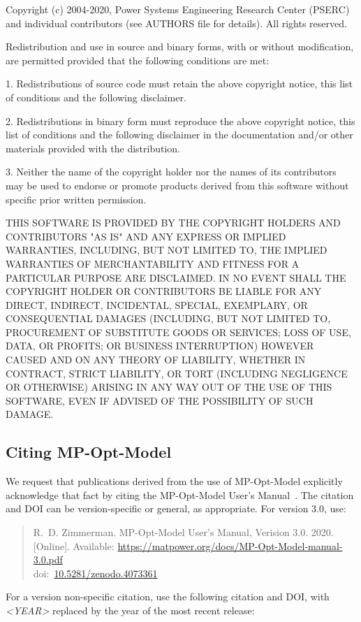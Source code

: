 \documentclass[12pt]{article}
\newcommand{\mpom}[0]{\mbox{MP-Opt-Model}}
\newcommand{\mpomname}[0]{\mpom{}}
\newcommand{\doi}[1]{doi:~\href{https://doi.org/#1}{#1}}
\numberwithin{equation}{section}
\numberwithin{table}{section}
\numberwithin{figure}{section}
\begin{document}
\begin{Notice}
Copyright (c) 2004-2020, Power Systems Engineering Research Center
(PSERC) and individual contributors (see AUTHORS file for details).
All rights reserved.

Redistribution and use in source and binary forms, with or without
modification, are permitted provided that the following conditions
are met:

1. Redistributions of source code must retain the above copyright
notice, this list of conditions and the following disclaimer.

2. Redistributions in binary form must reproduce the above copyright
notice, this list of conditions and the following disclaimer in the
documentation and/or other materials provided with the distribution.

3. Neither the name of the copyright holder nor the names of its
contributors may be used to endorse or promote products derived from
this software without specific prior written permission.

THIS SOFTWARE IS PROVIDED BY THE COPYRIGHT HOLDERS AND CONTRIBUTORS
"AS IS" AND ANY EXPRESS OR IMPLIED WARRANTIES, INCLUDING, BUT NOT
LIMITED TO, THE IMPLIED WARRANTIES OF MERCHANTABILITY AND FITNESS
FOR A PARTICULAR PURPOSE ARE DISCLAIMED. IN NO EVENT SHALL THE
COPYRIGHT HOLDER OR CONTRIBUTORS BE LIABLE FOR ANY DIRECT, INDIRECT,
INCIDENTAL, SPECIAL, EXEMPLARY, OR CONSEQUENTIAL DAMAGES (INCLUDING,
BUT NOT LIMITED TO, PROCUREMENT OF SUBSTITUTE GOODS OR SERVICES;
LOSS OF USE, DATA, OR PROFITS; OR BUSINESS INTERRUPTION) HOWEVER
CAUSED AND ON ANY THEORY OF LIABILITY, WHETHER IN CONTRACT, STRICT
LIABILITY, OR TORT (INCLUDING NEGLIGENCE OR OTHERWISE) ARISING IN
ANY WAY OUT OF THE USE OF THIS SOFTWARE, EVEN IF ADVISED OF THE
POSSIBILITY OF SUCH DAMAGE.
\end{Notice}

\clearpage
\subsection{Citing \mpom{}}

We request that publications derived from the use of \mpom{} explicitly acknowledge that fact by citing the \mpomname{} User's Manual~\cite{mpom_manual}.
The citation and DOI can be version-specific or general, as appropriate. For version 3.0, use:

\begin{quote}
\footnotesize
R.~D. Zimmerman. \mpomname{} User's Manual, Verision 3.0. 2020. [Online]. Available: \url{https://matpower.org/docs/MP-Opt-Model-manual-3.0.pdf}\\
\doi{10.5281/zenodo.4073361}
\end{quote}
For a version non-specific citation, use the following citation and DOI,
with \emph{\textless{}YEAR\textgreater{}} replaced by the year of the most recent release:
\end{document}
